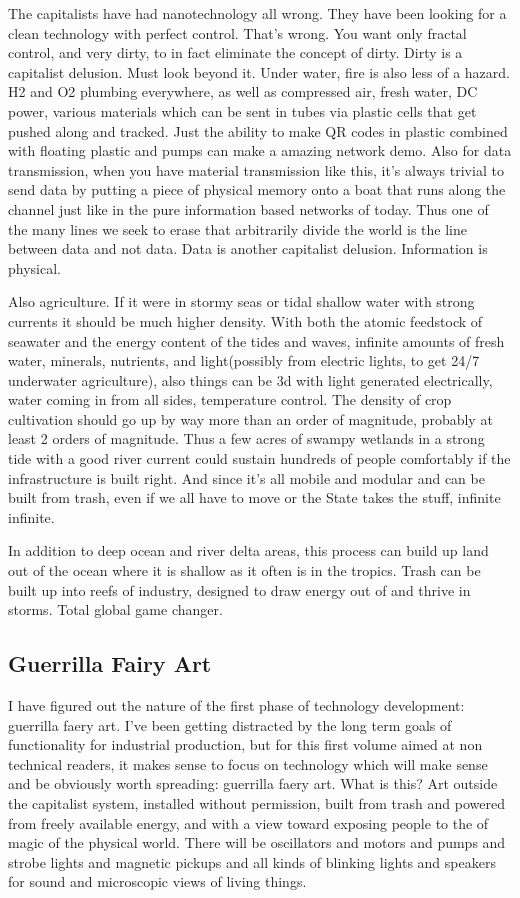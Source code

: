 The capitalists have had nanotechnology all wrong. They have been
looking for a clean technology with perfect control. That's wrong. You
want only fractal control, and very dirty, to in fact eliminate the
concept of dirty. Dirty is a capitalist delusion. Must look beyond it.
Under water, fire is also less of a hazard. H2 and O2 plumbing
everywhere, as well as compressed air, fresh water, DC power, various
materials which can be sent in tubes via plastic cells that get pushed
along and tracked. Just the ability to make QR codes in plastic combined
with floating plastic and pumps can make a amazing network demo. Also
for data transmission, when you have material transmission like this,
it's always trivial to send data by putting a piece of physical memory
onto a boat that runs along the channel just like in the pure
information based networks of today. Thus one of the many lines we seek
to erase that arbitrarily divide the world is the line between data and
not data. Data is another capitalist delusion. Information is physical.

Also agriculture. If it were in stormy seas or tidal shallow water with
strong currents it should be much higher density. With both the atomic
feedstock of seawater and the energy content of the tides and waves,
infinite amounts of fresh water, minerals, nutrients, and light(possibly
from electric lights, to get 24/7 underwater agriculture), also things
can be 3d with light generated electrically, water coming in from all
sides, temperature control. The density of crop cultivation should go up
by way more than an order of magnitude, probably at least 2 orders of
magnitude. Thus a few acres of swampy wetlands in a strong tide with a
good river current could sustain hundreds of people comfortably if the
infrastructure is built right. And since it's all mobile and modular and
can be built from trash, even if we all have to move or the State takes
the stuff, infinite infinite.

In addition to deep ocean and river delta areas, this process can build
up land out of the ocean where it is shallow as it often is in the
tropics. Trash can be built up into reefs of industry, designed to draw
energy out of and thrive in storms. Total global game changer.

\subsection{Guerrilla Fairy Art}\label{guerrilla-fairy-art}

I have figured out the nature of the first phase of technology
development: guerrilla faery art. I've been getting distracted by the
long term goals of functionality for industrial production, but for this
first volume aimed at non technical readers, it makes sense to focus on
technology which will make sense and be obviously worth spreading:
guerrilla faery art. What is this? Art outside the capitalist system,
installed without permission, built from trash and powered from freely
available energy, and with a view toward exposing people to the of magic
of the physical world. There will be oscillators and motors and pumps
and strobe lights and magnetic pickups and all kinds of blinking lights
and speakers for sound and microscopic views of living things.

